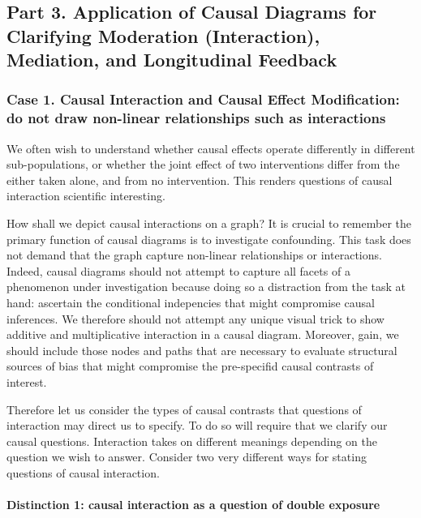\documentclass[
  singlecolumn,
  9pt]{article}
\let\oldparagraph\paragraph
\renewcommand{\paragraph}[1]{\oldparagraph{#1}\mbox{}}
\begin{document}
\subsection{Part 3. Application of Causal Diagrams for Clarifying
Moderation (Interaction), Mediation, and Longitudinal
Feedback}\label{part-3.-application-of-causal-diagrams-for-clarifying-moderation-interaction-mediation-and-longitudinal-feedback}

\subsubsection{Case 1. Causal Interaction and Causal Effect
Modification: do not draw non-linear relationships such as
interactions}\label{case-1.-causal-interaction-and-causal-effect-modification-do-not-draw-non-linear-relationships-such-as-interactions}

We often wish to understand whether causal effects operate differently
in different sub-populations, or whether the joint effect of two
interventions differ from the either taken alone, and from no
intervention. This renders questions of causal interaction scientific
interesting.

How shall we depict causal interactions on a graph? It is crucial to
remember the primary function of causal diagrams is to investigate
confounding. This task does not demand that the graph capture non-linear
relationships or interactions. Indeed, causal diagrams should not
attempt to capture all facets of a phenomenon under investigation
because doing so a distraction from the task at hand: ascertain the
conditional indepencies that might compromise causal inferences. We
therefore should not attempt any unique visual trick to show additive
and multiplicative interaction in a causal diagram. Moreover, gain, we
should include those nodes and paths that are necessary to evaluate
structural sources of bias that might compromise the pre-specifid causal
contrasts of interest.

Therefore let us consider the types of causal contrasts that questions
of interaction may direct us to specify. To do so will require that we
clarify our causal questions. Interaction takes on different meanings
depending on the question we wish to answer. Consider two very different
ways for stating questions of causal interaction.

\paragraph{Distinction 1: causal interaction as a question of double
exposure}\label{distinction-1-causal-interaction-as-a-question-of-double-exposure}
\end{document}
